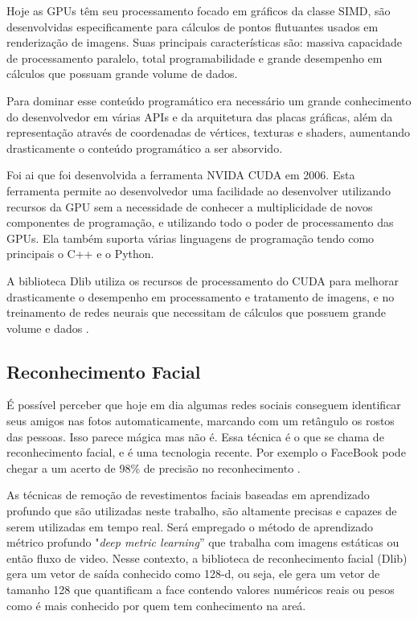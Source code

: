 Hoje as GPUs têm seu processamento focado em gráficos da classe SIMD, são desenvolvidas especificamente para cálculos de pontos flutuantes usados em renderização de imagens. Suas principais características são: massiva capacidade de processamento paralelo, total programabilidade e grande desempenho em cálculos que possuam grande volume de dados. 

Para dominar esse conteúdo programático era necessário um grande conhecimento do desenvolvedor em várias APIs e da arquitetura das placas gráficas, além da representação através de coordenadas de vértices, texturas e shaders, aumentando drasticamente o conteúdo programático a ser absorvido.

Foi ai que foi desenvolvida a ferramenta NVIDA CUDA em 2006. Esta ferramenta permite ao desenvolvedor uma facilidade ao desenvolver utilizando recursos da GPU sem a necessidade de conhecer a multiplicidade de novos componentes de programação, e utilizando todo o poder de processamento das GPUs. Ela também suporta várias linguagens de programação tendo como principais o C++ e o Python.

A biblioteca Dlib utiliza os recursos de processamento do CUDA para melhorar drasticamente o desempenho em processamento e tratamento de imagens, e no treinamento de redes neurais que necessitam de cálculos que possuem grande volume e dados \cite{vintenove}.

\subsection{Reconhecimento Facial}
\label{sec:recface}
É possível perceber que hoje em dia algumas redes sociais conseguem identificar seus amigos nas fotos automaticamente, marcando com um retângulo os rostos das pessoas. Isso parece mágica mas não é. Essa técnica é o que se chama de reconhecimento facial, e é uma tecnologia recente. Por exemplo o FaceBook pode chegar a um acerto de 98\% de precisão no reconhecimento \cite{adamgeitgey}.


As técnicas de remoção de revestimentos faciais baseadas em aprendizado profundo que são utilizadas neste trabalho, são altamente precisas e capazes de serem utilizadas em tempo real. Será empregado o método de aprendizado métrico profundo "\textit{deep metric learning}” que trabalha com imagens estáticas ou então fluxo de video. Nesse contexto, a biblioteca de reconhecimento facial (Dlib) gera um vetor de saída conhecido como 128-d, ou seja, ele gera um vetor de tamanho 128 que quantificam a face contendo valores numéricos reais ou pesos como é mais conhecido por quem tem conhecimento na areá. 

